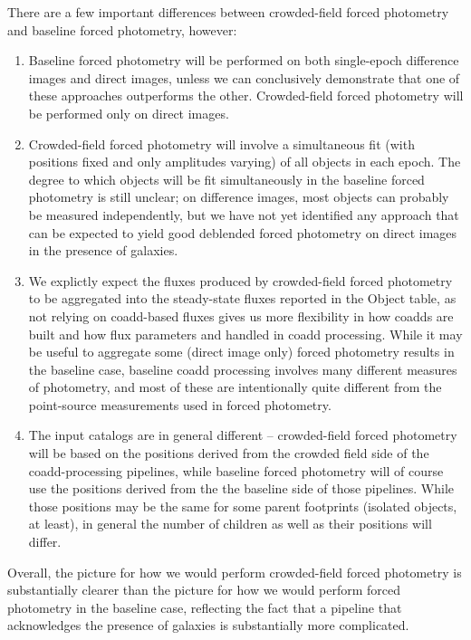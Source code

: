 \documentclass[DM,authoryear,toc]{lsstdoc}
\begin{document}
There are a few important differences between crowded-field forced photometry and baseline forced photometry, however:
\begin{enumerate}
\item Baseline forced photometry will be performed on both single-epoch difference images and direct images, unless we can conclusively demonstrate that one of these approaches outperforms the other.  Crowded-field forced photometry will be performed only on direct images.
\item Crowded-field forced photometry will involve a simultaneous fit (with positions fixed and only amplitudes varying) of all objects in each epoch.
The degree to which objects will be fit simultaneously in the baseline forced photometry is still unclear; on difference images, most objects can probably be measured independently, but we have not yet identified any approach that can be expected to yield good deblended forced photometry on direct images in the presence of galaxies.
\item We explictly expect the fluxes produced by crowded-field forced photometry to be aggregated into the steady-state fluxes reported in the Object table, as not relying on coadd-based fluxes gives us more flexibility in how coadds are built and how flux parameters and handled in coadd processing.
While it may be useful to aggregate some (direct image only) forced photometry results in the baseline case, baseline coadd processing involves many different measures of photometry, and most of these are intentionally quite different from the point-source measurements used in forced photometry.
\item The input catalogs are in general different -- crowded-field forced photometry will be based on the positions derived from the crowded field side of the coadd-processing pipelines, while baseline forced photometry will of course use the positions derived from the the baseline side of those pipelines.
While those positions may be the same for some parent footprints (isolated objects, at least), in general the number of children as well as their positions will differ.
\end{enumerate}

Overall, the picture for how we would perform crowded-field forced photometry is substantially clearer than the picture for how we would perform forced photometry in the baseline case, reflecting the fact that a pipeline that acknowledges the presence of galaxies is substantially more complicated.
\end{document}
